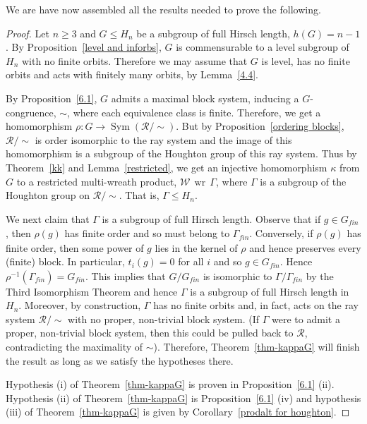 \documentclass[11pt,a4paper]{amsart}
\theoremstyle{definition}
\theoremstyle{remark}
\newcommand{\Sym}{\operatorname{Sym}}
\newcommand{\Ra}{\mathcal{R}}
\newcommand{\gfin}{G_{\textit{fin}}}
\renewcommand{\wr}{\operatorname{\,wr\,}}
\begin{document}
We are have now assembled all the results needed to prove the following.

\structure

\begin{proof}
	Let $n \ge 3$ and $G \leq H_n$ be a subgroup of full Hirsch length, $h(G)=n-1$. By Proposition~\ref{level and inforbs}, $G$ is commensurable to a level subgroup of $H_n$ with no finite orbits. Therefore we may assume that $G$ is level, has no finite orbits and acts with finitely many orbits, by Lemma~\ref{4.4}. 
	
	
	By Proposition~\ref{6.1}, $G$ admits a maximal block system, inducing a $G$-congruence, $\sim$, where each equivalence class is finite. Therefore, we get a homomorphism $\rho: G \to \Sym( \Ra / \sim)$. But by Proposition~\ref{ordering blocks}, $\Ra/ \sim$ is order isomorphic to the ray system and the image of this homomorphism is a subgroup of the Houghton group of this ray system. Thus by Theorem~\ref{kk} and Lemma~\ref{restricted}, we get an injective homomorphism $\kappa$ from $G$ to a restricted multi-wreath product, $\mathcal{W} \wr \Gamma$, where $\Gamma$ is a subgroup of the Houghton group on $\Ra/ \sim$. That is, $\Gamma \leq H_n$. 
	
	We next claim that $\Gamma$ is a subgroup of full Hirsch length. Observe that if $g \in \gfin$, then $\rho(g)$ has finite order and so must belong to $\Gamma_{\textit{fin}}$. Conversely, if $\rho(g)$ has finite order, then some power of $g$ lies in the kernel of $\rho$ and hence preserves every (finite) block. In particular, $t_i(g)=0$ for all $i$ and so $g \in \gfin$. Hence $\rho^{-1} (\Gamma_{\textit{fin}}) = \gfin$.  This implies that $G/\gfin$ is isomorphic to $\Gamma/\Gamma_{\textit{fin}}$ by the Third Isomorphism Theorem and hence $\Gamma$ is a subgroup of full Hirsch length in $H_n$. Moreover, by construction, $\Gamma$ has no finite orbits and, in fact, acts on the ray system $\Ra/ \sim$ with no proper, non-trivial block system. (If $\Gamma$ were to admit a proper, non-trivial block system, then this could be pulled back to $\Ra$, contradicting the maximality of $\sim$). Therefore, Theorem~\ref{thm-kappaG} will finish the result as long as we satisfy the hypotheses there. 
	
	Hypothesis (i) of Theorem~\ref{thm-kappaG} is proven in Proposition~\ref{6.1} (ii). Hypothesis (ii) of Theorem~\ref{thm-kappaG} is Proposition~\ref{6.1} (iv) and hypothesis (iii) of Theorem~\ref{thm-kappaG} is given by Corollary~\ref{prodalt for houghton}. 
	  
\end{proof}
\end{document}
